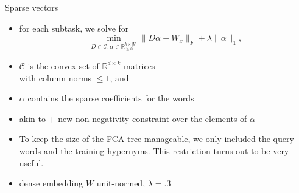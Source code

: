 \documentclass{beamer}
\newlength{\onecolwid}
\begin{document}
\begin{frame}[t]
\begin{columns}[t]
\begin{column}{\onecolwid}
    \begin{block}{Sparse vectors}
      \begin{itemize}
        \item for each subtask, we solve for
          \begin{equation}
            \min\limits_{D \in \mathcal{C}, \alpha \in
            \mathbb{R}_{\geq0}^{k\times |V|}} \lVert D\alpha - W_{x} \rVert_F + \lambda \lVert \alpha \rVert_1,
            \label{nonneg_SPAMS_objective}
          \end{equation}
        \item $\mathcal{C}$ is the convex set of $\mathbb{R}^{ d \times k}$
          matrices \\ with column norms $\le 1$, and
        \item $\alpha$ contains the sparse coefficients for the words
        \item akin to \citet{Berend:2017} + new non-negativity constraint over the
          elements of $\alpha$
        \item To keep the size of the FCA tree manageable, we only included the
          query words and the training hypernyms. This restriction turns out to be
          very useful.
        \item dense embedding $W$ unit-normed, $\lambda=.3$

      \end{itemize}
    \end{block}


\end{column}
\end{columns}
\end{frame}
\end{document}
